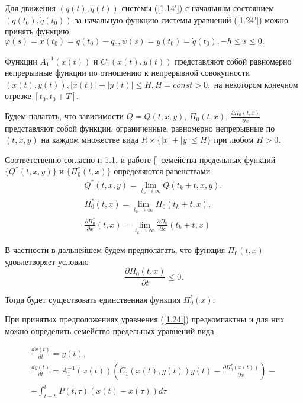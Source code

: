 Для движения $(q(t), \dot q(t))$ системы (\ref{1.14'}) с начальным состоянием $(q(t_0), \dot q(t_0))$ за начальную функцию системы уравнений (\ref{1.24'}) можно принять функцию $\varphi (s) = x(t_0) = q(t_0) - q_0, \psi (s) = y(t_0) = \dot q (t_0), -h \le s \le 0.$

Функции $A_1^{-1} (x(t))$ и $C_1(x(t), y(t))$ представляют собой равномерно непрерывные функции по отношению к непрерывной совокупности $(x(t), y(t)), \left| x(t) \right| + \left| y(t) \right| \le H, H = const > 0,$ на некотором конечном отрезке $[t_0, t_0 + T].$

Будем полагать, что зависимости $Q = Q(t, x, y)$, $\Pi_0 (t, x)$, $\frac{\partial \Pi_0 (t, x)}{\partial x}$ представляют собой функции, ограниченные, равномерно непрерывные по $(t, x, y)$ на каждом множестве вида $R \times \lbrace \left| x \right| + \left| y \right| \le H \rbrace$ при любом $H > 0.$

Соответственно согласно п 1.1. и работе [] семейства предельных функций $\lbrace Q^{*} (t, x, y) \rbrace$ и $\lbrace \Pi_0^{*} (t, x) \rbrace$ определяются равенствами 
$$\begin{array}{c}
	\displaystyle Q^{*} (t, x, y) = \lim_{t_k \to \infty} Q(t_k + t, x, y),\\
	\displaystyle \Pi_0^{*} (t, x) = \lim_{t_k \to \infty} \Pi_0 (t_k + t, x),\\ 
	\displaystyle \frac{\partial \Pi_0^{*}}{\partial x} (t, x) = \lim_{t_k \to \infty} \frac{\partial \Pi_0}{\partial x} (t_k + t, x)
\end{array}$$

В частности в дальнейшем будем предполагать, что функция $\Pi_0 (t, x)$ удовлетворяет условию
\begin{equation} \label{1.25_1'}
\frac{\partial \Pi_0 (t, x)}{\partial t} \le 0.
\end{equation}

Тогда будет существовать единственная функция $\Pi_0^{*} (x)$.

При принятых предположениях уравнения (\ref{1.24'}) предкомпактны и для них можно определить семейство предельных уравнений вида 

\begin{equation} \label{1.25'}
	\begin{array}{c}
		\frac{d x(t)}{d t} = y(t),\\
		\frac{d y(t)}{d t} = A_1^{-1} (x(t)) (C_1 (x(t), y(t)) y(t) - \frac{\partial \Pi_0^{*} (x(t))}{\partial x}) -\\- \displaystyle \int_{t- h}^{t} P(t, \tau) (x(t) - x(\tau)) d \tau
	\end{array}
\end{equation}

